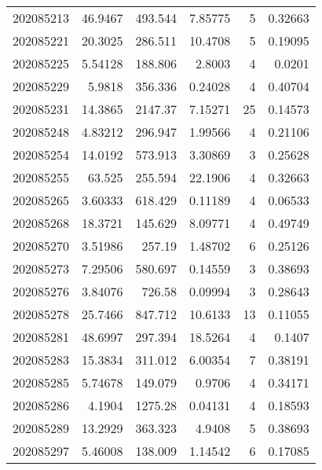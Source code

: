 \begin{tabular}{rrrrrr}
 202085213 &         46.9467  &      493.544  &            7.85775 &           5 & 0.32663 \\
 202085221 &         20.3025  &      286.511  &           10.4708  &           5 & 0.19095 \\
 202085225 &          5.54128 &      188.806  &            2.8003  &           4 & 0.0201  \\
 202085229 &          5.9818  &      356.336  &            0.24028 &           4 & 0.40704 \\
 202085231 &         14.3865  &     2147.37   &            7.15271 &          25 & 0.14573 \\
 202085248 &          4.83212 &      296.947  &            1.99566 &           4 & 0.21106 \\
 202085254 &         14.0192  &      573.913  &            3.30869 &           3 & 0.25628 \\
 202085255 &         63.525   &      255.594  &           22.1906  &           4 & 0.32663 \\
 202085265 &          3.60333 &      618.429  &            0.11189 &           4 & 0.06533 \\
 202085268 &         18.3721  &      145.629  &            8.09771 &           4 & 0.49749 \\
 202085270 &          3.51986 &      257.19   &            1.48702 &           6 & 0.25126 \\
 202085273 &          7.29506 &      580.697  &            0.14559 &           3 & 0.38693 \\
 202085276 &          3.84076 &      726.58   &            0.09994 &           3 & 0.28643 \\
 202085278 &         25.7466  &      847.712  &           10.6133  &          13 & 0.11055 \\
 202085281 &         48.6997  &      297.394  &           18.5264  &           4 & 0.1407  \\
 202085283 &         15.3834  &      311.012  &            6.00354 &           7 & 0.38191 \\
 202085285 &          5.74678 &      149.079  &            0.9706  &           4 & 0.34171 \\
 202085286 &          4.1904  &     1275.28   &            0.04131 &           4 & 0.18593 \\
 202085289 &         13.2929  &      363.323  &            4.9408  &           5 & 0.38693 \\
 202085297 &          5.46008 &      138.009  &            1.14542 &           6 & 0.17085 \\

\end{tabular}
